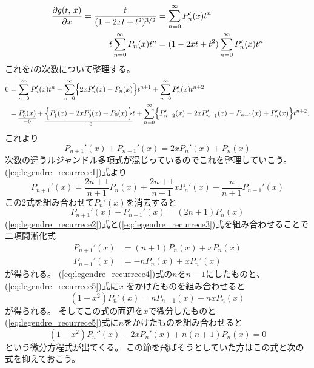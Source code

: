 \documentclass[../master.tex]{subfiles}
\begin{document}
\begin{align}
	\pdv{g(t,\,x)}{x} = \frac{t}{(1-2xt+t^2)^{3/2}} & = \sum_{n=0}^{\infty} P_n'(x) t^n            \\
	t\sum_{n=0}^{\infty} P_n(x) t^n                 & = (1-2xt+t^2)\sum_{n=0}^{\infty} P_n'(x) t^n
\end{align}
これを\(t\)の次数について整理する。
\begin{equation}\begin{aligned}[b]
    0 & = \sum_{n=0}^{\infty} P_n'(x)t^n - \sum_{n=0}^{\infty} \Bigl\{2xP_n'(x)+P_n(x)\Bigr\}t^{n+1} + \sum_{n=0}^{\infty}P_n'(x) t^{n+2} \\
	  & = \underset{=0}{\underline{P_0'(x)}}
	+\underset{=0}{\underline{\Bigl\{P_1'(x)-2xP_0'(x)-P_0(x)\Bigr\}}}t
	+\sum_{n=0}^{\infty}\Bigl\{P_{n-2}'(x)-2xP_{n-1}'(x)-P_{n-1}(x) +P_n'(x) \Bigr\}t^{n+2}.
\end{aligned}\end{equation}
これより
\begin{equation}
	P_{n+1}'(x)+P_{n-1}'(x) = 2xP_n'(x) + P_n(x) \label{eq:legendre_recurrece2}
\end{equation}
次数の違うルジャンドル多項式が混じっているのでこれを整理していこう。
(\ref{eq:legendre_recurrece1})式より
\begin{equation}
	P_{n+1}'(x) = \frac{2n+1}{n+1}P_n(x)+\frac{2n+1}{n+1}xP_n'(x) - \frac{n}{n+1}P_{n-1}'(x)
\end{equation}
この2式を組み合わせて\(P_n'(x)\)を消去すると
\begin{equation}
	P_{n+1}'(x)-P_{n-1}'(x) = (2n+1) P_n(x) \label{eq:legendre_recurrece3}
\end{equation}
(\ref{eq:legendre_recurrece2})式と(\ref{eq:legendre_recurrece3})式を組み合わせることで
二項間漸化式
\begin{align}
	P_{n+1}'(x) & = (n+1)P_n(x) + xP_n(x)\label{eq:legendre_recurrece4} \\
	P_{n-1}'(x) & = -nP_n(x)+xP_n'(x)\label{eq:legendre_recurrece5}
\end{align}
が得られる。
(\ref{eq:legendre_recurrece4})式の\(n\)を\(n-1\)にしたものと、
(\ref{eq:legendre_recurrece5})式に\(x\) をかけたものを組み合わせると
\begin{equation}
	(1-x^2)P_n'(x)= nP_{n-1}(x)-nxP_n(x)
\end{equation}
が得られる。
そしてこの式の両辺を\(x\)で微分したものと
(\ref{eq:legendre_recurrece5})式に\(n\)をかけたものを組み合わせると
\begin{equation}
	(1-x^2)P_n''(x)-2xP_n'(x)+n(n+1)P_n(x) = 0 \label{eq:legendre_dif_eq1}
\end{equation}
という微分方程式が出てくる。
この節を飛ばそうとしていた方はこの式と次の式を抑えておこう。
\end{document}
